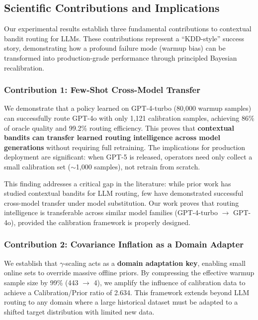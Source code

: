 \subsection{Scientific Contributions and Implications}
\label{sec:contributions}

Our experimental results establish three fundamental contributions to contextual bandit routing for LLMs. These contributions represent a ``KDD-style'' success story, demonstrating how a profound failure mode (warmup bias) can be transformed into production-grade performance through principled Bayesian recalibration.

\subsubsection{Contribution 1: Few-Shot Cross-Model Transfer}

We demonstrate that a policy learned on GPT-4-turbo (80,000 warmup samples) can successfully route GPT-4o with only 1,121 calibration samples, achieving 86\% of oracle quality and 99.2\% routing efficiency. This proves that \textbf{contextual bandits can transfer learned routing intelligence across model generations} without requiring full retraining. The implications for production deployment are significant: when GPT-5 is released, operators need only collect a small calibration set ($\sim$1,000 samples), not retrain from scratch.

This finding addresses a critical gap in the literature: while prior work has studied contextual bandits for LLM routing, few have demonstrated successful cross-model transfer under model substitution. Our work proves that routing intelligence is transferable across similar model families (GPT-4-turbo $\to$ GPT-4o), provided the calibration framework is properly designed.

\subsubsection{Contribution 2: Covariance Inflation as a Domain Adapter}

We establish that $\gamma$-scaling acts as a \textbf{domain adaptation key}, enabling small online sets to override massive offline priors. By compressing the effective warmup sample size by 99\% (443 $\to$ 4), we amplify the influence of calibration data to achieve a Calibration/Prior ratio of 2.634. This framework extends beyond LLM routing to any domain where a large historical dataset must be adapted to a shifted target distribution with limited new data.

